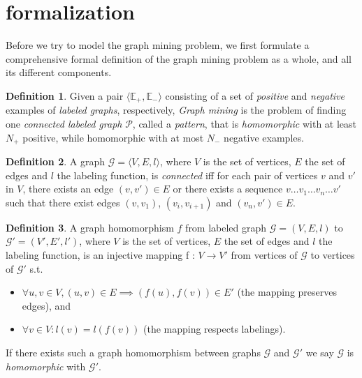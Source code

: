 \documentclass{article}
\theoremstyle{definition}
\newtheorem{definition}{Definition}[section]
\newcommand{\triple}[1]{\ensuremath{\langle #1 \rangle}}
\newcommand{\pair}[1]{\ensuremath{\left(#1\right)}}
\newcommand{\graph}[1]{\ensuremath{\mathcal{#1}}}
\newcommand{\graphset}[1]{\ensuremath{\mathbb{#1}}}
\begin{document}
\section{formalization}
Before we try to model the graph mining problem, we first formulate a comprehensive formal definition of the graph mining problem as a whole, and all its different components.

\begin{definition}
\label{def:GM1}
Given a pair $\triple{\graphset{E}_{+},\graphset{E}_{-}}$ consisting of a set of \emph{positive} and \emph{negative} examples of \emph{labeled graphs}, respectively,
\emph{Graph mining} is the problem of finding one \emph{connected labeled graph} $\graph{P}$, called a \emph{pattern},
that is \emph{homomorphic} with at least $N_{+}$ positive, while homomorphic with at most $N_{-}$ negative examples.
\end{definition}

\begin{definition}
A graph $\graph{G} = \triple{V,E,l}$, where $V$ is the set of vertices, $E$ the set of edges and $l$ the labeling function, is \emph{connected} iff for each pair of vertices $v$ and $v'$ in $V$, there exists an edge $\pair{v,v'} \in E$ or there exists a sequence $v \ldots v_{1} \ldots v_{n} \ldots v'$ such that there exist edges $\pair{v,v_{1}}$, $\pair{v_{i},v_{i+1}}$ and $\pair{v_{n},v'} \in E$.
\end{definition}


\begin{definition}
A graph homomorphism $f$ from labeled graph $\graph{G} = (V,E,l)$ to $\graph{G}' = (V',E',l')$, where $V$ is the set of vertices, $E$ the set of edges and $l$ the labeling function, is an injective mapping f : $V \rightarrow V'$ from vertices of $\graph{G}$ to vertices of $\graph{G'}$ s.t. 
\begin{itemize}
\item $\forall u,v \in V, \pair{u,v} \in E \implies \pair{f(u),f(v)} \in E'$ (the mapping preserves edges), and 
\item $\forall v \in V : l(v) = l(f(v))$ (the mapping respects labelings).
\end{itemize}
If there exists such a graph homomorphism between graphs $\graph{G}$ and $\graph{G'}$ we say $\graph{G}$ is \emph{homomorphic} with $\graph{G'}$.
\end{definition}
\end{document}
